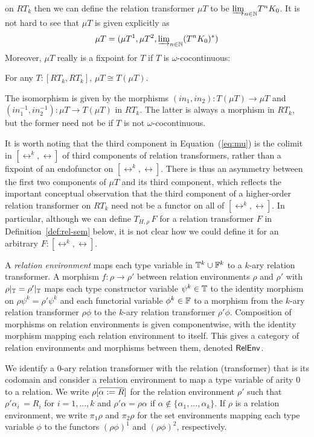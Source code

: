 \documentclass{lmcs}
\theoremstyle{plain}\newtheorem{satz}[thm]{Satz}
\begin{document}
{on $RT_k$ then we can define the relation transformer $\mu T$ to be
${{\underrightarrow{\lim}}_{n \in \mathbb{N}}{T^n K_0}}$. It is not hard to see that $\mu T$ is
given explicitly as
\begin{equation}\label{eq:mu}
\mu T = (\mu T^1,\mu T^2, {{\underrightarrow{\lim}}_{n \in \mathbb{N}}{(T^nK_0)^*}})
\end{equation}
Moreover, $\mu T$ really is a fixpoint for $T$ if $T$ is
$\omega$-cocontinuous:
\begin{lem}\label{lem:fp}
For any $T : [RT_k,RT_k]$, $\mu T \cong T(\mu T)$.
\end{lem}
\noindent
The isomorphism is given by the morphisms $(\mathit{in}_1,
\mathit{in}_2) : T(\mu T) \to \mu T$ and $(in_1^{-1}, in_2^{-1}) : \mu
T \to T(\mu T)$ in $RT_k$. The latter is always a morphism in $RT_k$,
but the former need not be if $T$ is not $\omega$-cocontinuous.

It is worth noting that the third component in Equation~(\ref{eq:mu})
is the colimit in $[\rel^k,\rel]$ of third components of relation
transformers, rather than a fixpoint of an endofunctor on
$[\rel^k,\rel]$. There is thus an asymmetry between the first two
components of $\mu T$ and its third component, which reflects the
important conceptual observation that the third component of a
higher-order relation transformer on $RT_k$ need not be a functor on
all of $[\rel^k,\rel]$. In particular, although we can define
$T_{H,\rho}\, F$ for a relation transformer $F$ in
Definition~\ref{def:rel-sem} below, it is not clear how we could
define it for an arbitrary $F : [\rel^k,\rel]$.

\begin{defi}\label{def:reln-env}
A {\em relation environment} maps each type variable in $\mathbb{T}^k \cup
\mathbb{F}^k$ to a $k$-ary relation transformer.  A morphism $f : \rho \to
\rho'$ between relation environments $\rho$ and $\rho'$ with
$\rho|_{\mathbb{T}} = \rho'|_{\mathbb{T}}$ maps each type constructor variable
$\psi^k \in \mathbb{T}$ to the identity morphism on $\rho \psi^k = \rho'
\psi^k$ and each functorial variable $\phi^k \in \mathbb{F}$ to a morphism
from the $k$-ary relation transformer $\rho \phi$ to the $k$-ary
relation transformer $\rho' \phi$. Composition of morphisms on
relation environments is given componentwise, with the identity
morphism mapping each relation environment to itself. This gives a
category of relation environments and morphisms between them, denoted
$\mathsf{RelEnv}$.
\end{defi}
We identify a $0$-ary relation transformer with the relation
(transformer) that is its codomain and consider a relation environment
to map a type variable of arity $0$ to a relation.  We write
$\rho[\overline{\alpha := R}]$ for the relation environment $\rho'$ such
that $\rho' \alpha_i \, = R_i$ for $i = 1,...,k$ and $\rho' \alpha =
\rho\alpha$ if $\alpha \not \in \{\alpha_1,...,\alpha_k\}$.  If $\rho$
is a relation environment, we write $\pi_1 \rho$ and $\pi_2 \rho$ for
the set environments mapping each type variable $\phi$ to the functors
$(\rho\phi)^1$ and $(\rho\phi)^2$, respectively.

}
\end{document}
